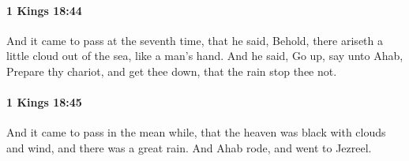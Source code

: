 		\paragraph{1 Kings 18:44} %
			\label{1KINGS-18-44}

			And it came to pass at the seventh time, that he said, Behold, there ariseth a little cloud out of the sea, like a man’s hand. And he said, Go up, say unto Ahab, Prepare thy chariot, and get thee down, that the rain stop thee not.


		\paragraph{1 Kings 18:45} %
			\label{1KINGS-18-45}

			And it came to pass in the mean while, that the heaven was black with clouds and wind, and there was a great rain. And Ahab rode, and went to Jezreel.

